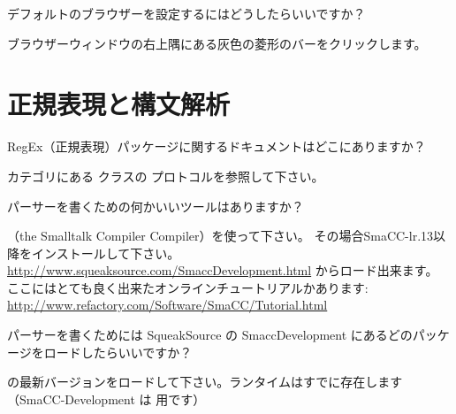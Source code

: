 \documentclass[a4paper,10pt,twoside]{book}
\begin{document}
\begin{faq}
デフォルトのブラウザーを設定するにはどうしたらいいですか？
\end{faq}
\answer
ブラウザーウィンドウの右上隅にある灰色の菱形のバーをクリックします。

\section{正規表現と構文解析}


\begin{faq}
RegEx（正規表現）パッケージに関するドキュメントはどこにありますか？
\end{faq}
\answer
{} カテゴリにある  クラスの  プロトコルを参照して下さい。

\begin{faq}
パーサーを書くための何かいいツールはありますか？
\end{faq}
\answer
{}（the Smalltalk Compiler Compiler）を使って下さい。
その場合SmaCC-lr.13以降をインストールして下さい。
\url{http://www.squeaksource.com/SmaccDevelopment.html} からロード出来ます。
ここにはとても良く出来たオンラインチュートリアルかあります:
\url{http://www.refactory.com/Software/SmaCC/Tutorial.html}

\begin{faq}
パーサーを書くためには SqueakSource の SmaccDevelopment にあるどのパッケージをロードしたらいいですか？
\end{faq}
\answer
{} の最新バージョンをロードして下さい。ランタイムはすでに存在します
（SmaCC-Development は  用です）

\ifx\wholebook\relax\else
\end{document}
